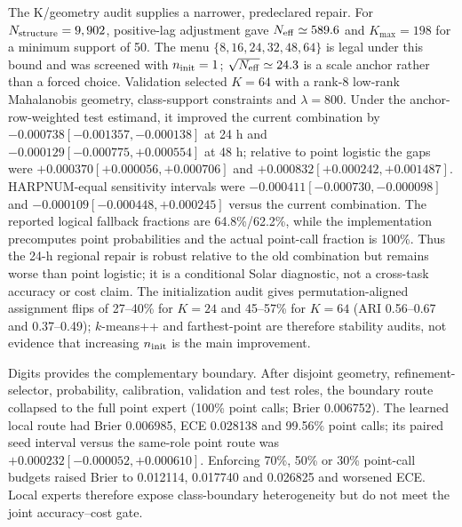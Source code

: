 \documentclass[11pt,a4paper]{article}
\numberwithin{equation}{section}
\theoremstyle{definition}\newtheorem{definition}[theorem]{Definition}
\theoremstyle{remark}\newtheorem{remark}[theorem]{Remark}
\begin{document}
The K/geometry audit supplies a narrower, predeclared repair. For $N_{\rm structure}=9,902$, positive-lag adjustment gave $N_{\rm eff}\simeq589.6$ and $K_{\max}=198$ for a minimum support of 50. The menu $\{8,16,24,32,48,64\}$ is legal under this bound and was screened with $n_{\rm init}=1$; $\sqrt{N_{\rm eff}}\simeq24.3$ is a scale anchor rather than a forced choice. Validation selected $K=64$ with a rank-8 low-rank Mahalanobis geometry, class-support constraints and $\lambda=800$. Under the anchor-row-weighted test estimand, it improved the current combination by $-0.000738[-0.001357,-0.000138]$ at 24 h and $-0.000129[-0.000775,+0.000554]$ at 48 h; relative to point logistic the gaps were $+0.000370[+0.000056,+0.000706]$ and $+0.000832[+0.000242,+0.001487]$. HARPNUM-equal sensitivity intervals were $-0.000411[-0.000730,-0.000098]$ and $-0.000109[-0.000448,+0.000245]$ versus the current combination. The reported logical fallback fractions are 64.8\%/62.2\%, while the implementation precomputes point probabilities and the actual point-call fraction is 100\%. Thus the 24-h regional repair is robust relative to the old combination but remains worse than point logistic; it is a conditional Solar diagnostic, not a cross-task accuracy or cost claim. The initialization audit gives permutation-aligned assignment flips of 27--40\% for $K=24$ and 45--57\% for $K=64$ (ARI 0.56--0.67 and 0.37--0.49); $k$-means++ and farthest-point are therefore stability audits, not evidence that increasing $n_{\rm init}$ is the main improvement.

Digits provides the complementary boundary. After disjoint geometry, refinement-selector, probability, calibration, validation and test roles, the boundary route collapsed to the full point expert (100\% point calls; Brier 0.006752). The learned local route had Brier 0.006985, ECE 0.028138 and 99.56\% point calls; its paired seed interval versus the same-role point route was $+0.000232[-0.000052,+0.000610]$. Enforcing 70\%, 50\% or 30\% point-call budgets raised Brier to 0.012114, 0.017740 and 0.026825 and worsened ECE. Local experts therefore expose class-boundary heterogeneity but do not meet the joint accuracy--cost gate.
\end{document}
